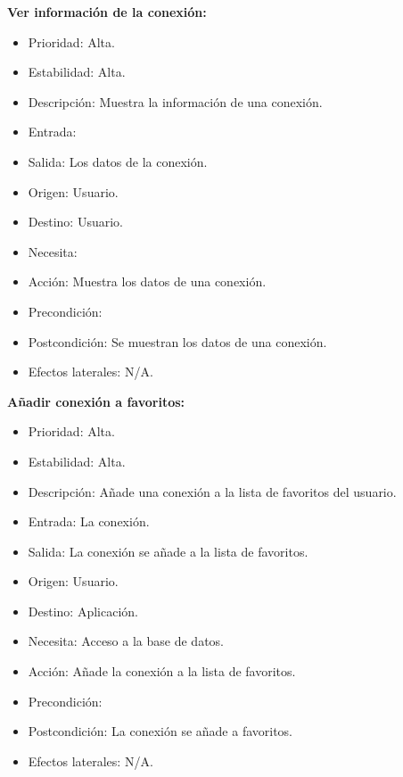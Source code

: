 \textbf{Ver información de la conexión:}
\begin{itemize}
\item Prioridad: Alta.
\item Estabilidad: Alta.
\item Descripción: Muestra la información de una conexión.
\item Entrada:
\item Salida: Los datos de la conexión.
\item Origen: Usuario.
\item Destino: Usuario.
\item Necesita:
\item Acción: Muestra los datos de una conexión.
\item Precondición:
\item Postcondición: Se muestran los datos de una conexión.
\item Efectos laterales: N/A.\\

\end{itemize}
\newpage
\textbf{Añadir conexión a favoritos:}
\begin{itemize}
\item Prioridad: Alta.
\item Estabilidad: Alta.
\item Descripción: Añade una conexión a la lista de favoritos del usuario.
\item Entrada: La conexión.
\item Salida: La conexión se añade a la lista de favoritos.
\item Origen: Usuario.
\item Destino: Aplicación.
\item Necesita: Acceso a la base de datos.
\item Acción: Añade la conexión a la lista de favoritos.
\item Precondición:
\item Postcondición: La conexión se añade a favoritos.
\item Efectos laterales: N/A.\\

\end{itemize}

